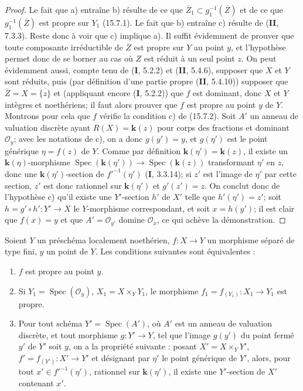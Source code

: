 \begin{proof}
Le fait que a) entraîne b) résulte de ce que $\overline Z_1\subset g_1^{-1}(\overline Z)$ et de ce que $g_1^{-1}(\overline Z)$ est propre sur $Y_1$ (15.7.1). Le fait que b) entraîne c) résulte de (\textbf{II}, 7.3.3). Reste donc à voir que c) implique a). Il suffit évidemment de prouver que toute composante irréductible de $\overline Z$ est propre sur $Y$ au point $y$, et l'hypothèse permet donc de se borner au cas où $Z$ est réduit à un seul point $z$. On peut évidemment aussi, compte tenu de (\textbf{I}, 5.2.2) et (\textbf{II}, 5.4.6), supposer que $X$ et $Y$ sont réduits, puis (par définition d'une partie propre (\textbf{II}, 5.4.10)) supposer que $\overline Z=X=\overline{\{z\}}$ et (appliquant encore (\textbf{I}, 5.2.2)) que $f$ est dominant, donc $X$ et $Y$ intègres et noethériens; il faut alors prouver que $f$ est propre au point $y$ de $Y$. Montrons pour cela que $f$ vérifie la condition c) de (15.7.2). Soit $A'$ un anneau de valuation discrète ayant $R(X)=\mathbf k(z)$ pour corps des fractions et dominant $\mathcal O_y$; avec les notations de c), on a donc $g(y')=y$, et $g(\eta')$ est le point générique $\eta=f(z)$ de $Y$. Comme par définition $\mathbf k(\eta')=\mathbf k(z)$, il existe un $\mathbf k(\eta)$-morphisme $\operatorname{Spec}(\mathbf k(\eta'))\to\operatorname{Spec}(\mathbf k(z))$ transformant $\eta'$ en $z$, donc une $\mathbf k(\eta')$-section de $f'^{-1}(\eta')$ (\textbf{I}, 3.3.14); si $z'$ est l'image de $\eta'$ par cette section, $z'$ est donc rationnel sur $\mathbf k(\eta')$ et $g'(z')=z$. On conclut donc de l'hypothèse c) qu'il existe une $Y'$-section $h'$ de $X'$ telle que $h'(\eta')=z'$; soit $h=g'\circ h':Y'\to X$ le $Y$-morphisme correspondant, et soit $x=h(y')$; il est clair que $f(x)=y$ et que $A'=\mathcal O_{y'}$ domine $\mathcal O_x$, ce qui achève la démonstration.
\end{proof}

\begin{corollary}[15.7.5]
\label{IV.15.7.5-fr}
Soient $Y$ un préschéma localement noethérien, $f:X\to Y$ un morphisme séparé de type fini, $y$ un point de $Y$. Les conditions suivantes sont équivalentes :
\begin{enumerate}
  \item[\rm a)] $f$ est propre au point $y$.
  \item[\rm b)] Si $Y_1=\operatorname{Spec}(\mathcal O_y)$, $X_1=X\times_Y Y_1$, le morphisme $f_1=f_{(Y_1)}:X_1\to Y_1$ est propre.
  \item[\rm c)] Pour tout schéma $Y'=\operatorname{Spec}(A')$, où $A'$ est un anneau de valuation discrète, et tout morphisme $g:Y'\to Y$, tel que l'image $g(y')$ du point fermé $y'$ de $Y'$ soit $y$, on a la propriété suivante : posant $X'=X\times_Y Y'$, $f'=f_{(Y')}:X'\to Y'$ et désignant par $\eta'$ le point générique de $Y'$, alors, pour tout $x'\in f'^{-1}(\eta')$, rationnel sur $\mathbf k(\eta')$, il existe une $Y'$-section de $X'$ contenant $x'$.
\end{enumerate}
\end{corollary}

